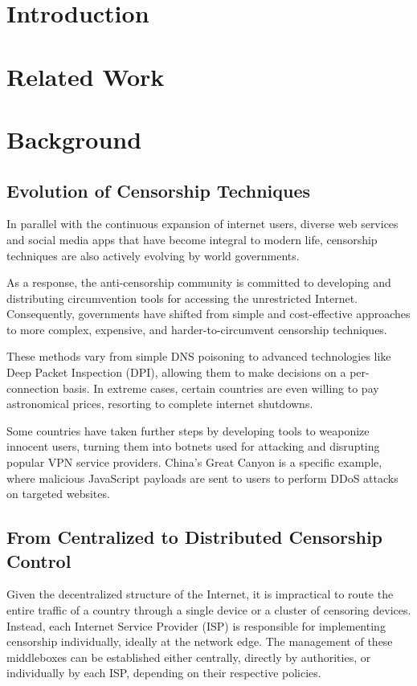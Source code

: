 \section{Introduction}

\section{Related Work}

\section{Background}

\subsection{Evolution of Censorship Techniques}
In parallel with the continuous expansion of internet users, diverse web services and social media apps that have become integral to modern life, censorship techniques are also actively evolving by world governments. 

As a response, the anti-censorship community is committed to developing and distributing circumvention tools for accessing the unrestricted Internet. Consequently, governments have shifted from simple and cost-effective approaches to more complex, expensive, and harder-to-circumvent censorship techniques.

These methods vary from simple DNS poisoning to advanced technologies like Deep Packet Inspection (DPI), allowing them to make decisions on a per-connection basis. In extreme cases, certain countries are even willing to pay astronomical prices, resorting to complete internet shutdowns.

Some countries have taken further steps by developing tools to weaponize innocent users, turning them into botnets used for attacking and disrupting popular VPN service providers. China's Great Canyon is a specific example, where malicious JavaScript payloads are sent to users to perform DDoS attacks on targeted websites.\cite{marczak2015great}

\subsection{From Centralized to Distributed Censorship Control}
Given the decentralized structure of the Internet, it is impractical to route the entire traffic of a country through a single device or a cluster of censoring devices. Instead, each Internet Service Provider (ISP) is responsible for implementing censorship individually, ideally at the network edge. The management of these middleboxes can be established either centrally, directly by authorities, or individually by each ISP, depending on their respective policies.

